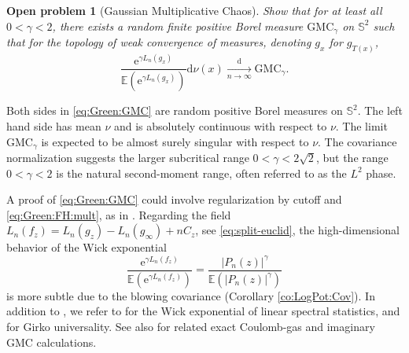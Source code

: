 \documentclass[10pt,reqno]{amsart}
\numberwithin{equation}{section}
\numberwithin{figure}{section}
\theoremstyle{plain}
\newtheorem{openproblem}[theorem]{Open problem}
\newcommand{\<}{\langle}
\renewcommand{\>}{\rangle}
\begin{document}
\begin{openproblem}[Gaussian Multiplicative Chaos]\label{op:Green:GMC}
Show that for at least all $0<\gamma<2$, there exists a random finite positive Borel measure $\mathrm{GMC}_\gamma$ on $\mathbb{S}^2$ such that for the topology of weak convergence of measures, denoting $g_x$ for $g_{T(x)}$,
    \begin{equation}\label{eq:Green:GMC}
        \frac{\mathrm{e}^{\gamma L_n(g_x)}}{\mathbb{E}(\mathrm{e}^{\gamma L_n(g_x)})}
        \mathrm{d}\nu(x)        
        \xrightarrow[n\to\infty]{\mathrm{d}}
        \mathrm{GMC}_\gamma.
    \end{equation}
\end{openproblem}

%
Both sides in \eqref{eq:Green:GMC} are random positive Borel measures on $\mathbb{S}^2$. The left hand side has mean $\nu$ and is absolutely continuous with respect to $\nu$. The limit $\mathrm{GMC}_\gamma$ is expected to be almost surely singular with respect to $\nu$. The covariance normalization suggests the larger subcritical range $0<\gamma<2\sqrt2$, but the range $0<\gamma<2$ is the natural second-moment range, often referred to as the $L^2$ phase.

A proof of \eqref{eq:Green:GMC} could involve regularization by cutoff and \eqref{eq:Green:FH:mult}, as in \cite{bourgadeetal}. Regarding the field $L_n(f_z)=L_n(g_z)-L_n(g_\infty)+nC_z$, see \eqref{eq:split-euclid}, the high-dimensional behavior of the Wick exponential 
\begin{equation}
    \frac{\mathrm{e}^{\gamma L_n(f_z)}}{\mathbb{E}(\mathrm{e}^{\gamma L_n(f_z)})}
    =\frac{|P_n(z)|^\gamma}{\mathbb{E}(|P_n(z)|^\gamma)}
\end{equation}
is more subtle due to the blowing covariance (Corollary \ref{co:LogPot:Cov}). In addition to \cite{bourgadeetal}, we refer to \cite{zbMATH06514487,zbMATH07207623} for the Wick exponential of linear spectral statistics, and
\cite{cipolloni2026gaussianmultiplicativechaosiid} for Girko universality.
See also \cite{chatterjee2026exactcalculationschargeneutrality} for related exact
Coulomb-gas and imaginary GMC calculations.
\end{document}
